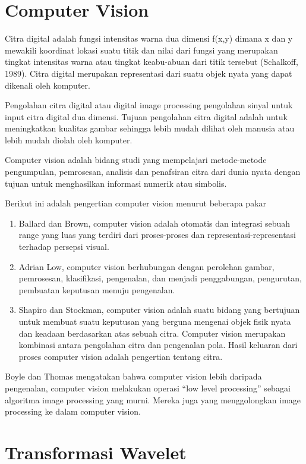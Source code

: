 \documentclass[laporan.tex]{subfiles}
\begin{document}
\section{Computer Vision}

Citra digital adalah fungsi intensitas warna dua dimensi f(x,y) dimana x dan y mewakili koordinat lokasi suatu titik dan nilai dari fungsi yang merupakan tingkat intensitas warna atau tingkat keabu-abuan dari titik tersebut (Schalkoff, 1989). Citra digital merupakan representasi dari suatu objek nyata yang dapat dikenali oleh komputer.

Pengolahan citra digital atau digital image processing pengolahan sinyal untuk input citra digital dua dimensi. Tujuan pengolahan citra digital adalah untuk meningkatkan kualitas gambar sehingga lebih mudah dilihat oleh manusia atau lebih mudah diolah oleh komputer.

Computer vision adalah bidang studi yang mempelajari metode-metode pengumpulan, pemrosesan, analisis dan penafsiran citra dari dunia nyata dengan tujuan untuk menghasilkan informasi numerik atau simbolis.

Berikut ini adalah pengertian computer vision menurut beberapa pakar

\begin{enumerate}
\item Ballard dan Brown, computer vision adalah otomatis dan integrasi sebuah range yang luas yang terdiri dari proses-proses dan representasi-representasi terhadap persepsi visual.
\item Adrian Low, computer vision berhubungan dengan perolehan gambar, pemrosesan, klasifikasi, pengenalan, dan menjadi penggabungan, pengurutan, pembuatan keputusan menuju pengenalan.
\item Shapiro dan Stockman, computer vision adalah suatu bidang yang bertujuan untuk membuat suatu keputusan yang berguna mengenai objek fisik nyata dan keadaan berdasarkan atas sebuah citra. Computer vision merupakan kombinasi antara pengolahan citra dan pengenalan pola. Hasil keluaran dari proses computer vision adalah pengertian tentang citra.
\end{enumerate}

Boyle dan Thomas mengatakan bahwa computer vision lebih daripada pengenalan, computer vision melakukan operasi “low level processing” sebagai algoritma image processing yang murni. Mereka juga yang menggolongkan image processing ke dalam computer vision.

\section{Transformasi Wavelet}
\end{document}
